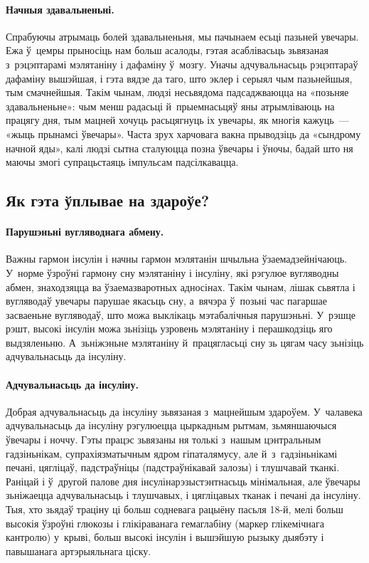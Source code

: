 \paragraph{Начныя здавальненьні.}
Спрабуючы атрымаць болей здавальненьня, мы пачынаем есьці пазьней увечары. Ежа ў~цемры прыносіць нам больш асалоды, гэтая асаблівасьць зьвязаная з~рэцэптарамі мэлятаніну і дафаміну ў~мозгу. Уначы адчувальнасьць рэцэптараў дафаміну вышэйшая, і гэта вядзе да таго, што эклер і серыял чым пазьнейшыя, тым смачнейшыя. Такім чынам, людзі несьвядома падсаджваюцца на «позьняе здавальненьне»: чым менш радасьці й~прыемнасьцяў яны атрымліваюць на працягу дня, тым мацней хочуць расьцягнуць іх увечары, як многія кажуць~--- «жыць прынамсі ўвечары». Часта зрух харчовага вакна прыводзіць да «сындрому начной яды», калі людзі сытна сталуюцца позна ўвечары і ўночы, бадай што ня маючы змогі супрацьстаяць імпульсам падсілкавацца.

\subsection{Як гэта ўплывае на здароўе?}

\paragraph{Парушэньні вугляводнага абмену.}
Важны гармон інсулін і начны гармон мэлятанін шчыльна ўзаемадзейнічаюць. У~норме ўзроўні гармону сну мэлятаніну і інсуліну, які рэгулюе вугляводны абмен, знаходзяцца ва ўзаемазваротных адносінах. Такім чынам, лішак сьвятла і вугляводаў увечары парушае якасьць сну, а~вячэра ў~позьні час пагаршае засваеньне вугляводаў, што можа выклікаць мэтабалічныя парушэньні. У~рэшце рэшт, высокі інсулін можа зьнізіць узровень мэлятаніну і перашкодзіць яго выдзяленьню. А~зьніжэньне мэлятаніну й~працягласьці сну зь цягам часу зьнізіць адчувальнасьць да інсуліну.

\paragraph{Адчувальнасьць да інсуліну.}
Добрая адчувальнасьць да інсуліну зьвязаная з~мацнейшым здароўем. У~чалавека адчувальнасьць да інсуліну рэгулюецца цыркадным рытмам, зьмяншаючыся ўвечары і ноччу. Гэты працэс зьвязаны ня толькі з~нашым цэнтральным гадзіньнікам, супрахіязматычным ядром гіпаталямусу, але й~з~гадзіньнікамі печані, цягліцаў, падстраўніцы (падстраўнікавай залозы) і тлушчавай тканкі. Раніцай і ў~другой палове дня інсулінарэзыстэнтнасьць мінімальная, але ўвечары зьніжаецца адчувальнасьць і тлушчавых, і цягліцавых тканак і печані да інсуліну. Тыя, хто зьядаў траціну ці больш содневага рацыёну пасьля 18-й, мелі больш высокія ўзроўні глюкозы і глікіраванага гемаглабіну (маркер глікемічнага кантролю) у~крыві, больш высокі інсулін і вышэйшую рызыку дыябэту і павышанага артэрыяльнага ціску.

